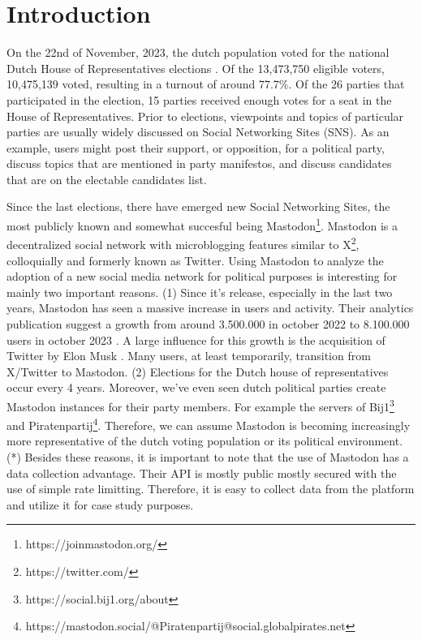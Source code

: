 \section{Introduction}

On the 22nd of November, 2023, the dutch population voted for the national Dutch House of Representatives elections \cite{kies}.
Of the 13,473,750 eligible voters, 10,475,139 voted, resulting in a turnout of around 77.7\%.
Of the 26 parties that participated in the election, 15 parties received enough votes for a seat in the House of Representatives.
Prior to elections, viewpoints and topics of particular parties are usually widely discussed on Social Networking Sites (SNS).
As an example, users might post their support, or opposition, for a political party, discuss topics that are mentioned in party manifestos, and discuss candidates that are on the electable candidates list.

Since the last elections, there have emerged new Social Networking Sites, the most publicly known and somewhat succesful being Mastodon\footnote{https://joinmastodon.org/}.
Mastodon is a decentralized social network with microblogging features similar to X\footnote{https://twitter.com/}, colloquially and formerly known as Twitter.
Using Mastodon to analyze the adoption of a new social media network for political purposes is interesting for mainly two important reasons. 
(1) Since it's release, especially in the last two years, Mastodon has seen a massive increase in users and activity.
Their analytics publication suggest a growth from around 3.500.000 in october 2022 to 8.100.000 users in october 2023 \cite{analytics}.
A large influence for this growth is the acquisition of Twitter by Elon Musk \cite{musk}.
Many users, at least temporarily, transition from X/Twitter to Mastodon.
(2) Elections for the Dutch house of representatives occur every 4 years.
Moreover, we've even seen dutch political parties create Mastodon instances for their party members.
For example the servers of Bij1\footnote{https://social.bij1.org/about} and Piratenpartij\footnote{https://mastodon.social/@Piratenpartij@social.globalpirates.net}.
Therefore, we can assume Mastodon is becoming increasingly more representative of the dutch voting population or its political environment.
(*) Besides these reasons, it is important to note that the use of Mastodon has a data collection advantage.
Their API is mostly public mostly secured with the use of simple rate limitting.
Therefore, it is easy to collect data from the platform and utilize it for case study purposes.

